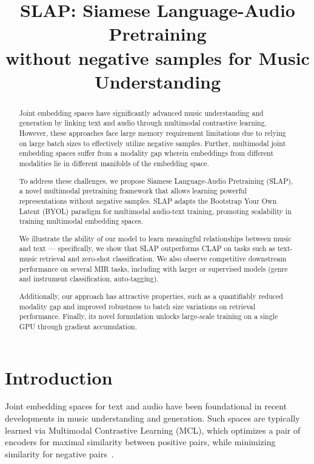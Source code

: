 \documentclass{article}
\title{SLAP: Siamese Language-Audio Pretraining\\without negative samples for Music Understanding}
\begin{document}
%
\maketitle

\begin{abstract}


Joint embedding spaces have significantly advanced music understanding and generation by linking text and audio through multimodal contrastive learning.
However, these approaches face large memory requirement limitations due to relying on large batch sizes to effectively utilize negative samples. Further, multimodal joint embedding spaces suffer from a modality gap wherein embeddings from different modalities lie in different manifolds of the embedding space.

To address these challenges, we propose Siamese Language-Audio Pretraining (SLAP), a novel multimodal pretraining framework that allows learning powerful representations without negative samples. SLAP adapts the Bootstrap Your Own Latent (BYOL) paradigm for multimodal audio-text training, promoting scalability in training multimodal embedding spaces.

We illustrate the ability of our model to learn meaningful relationships between music and text --- specifically, we show that SLAP outperforms CLAP on tasks such as text-music retrieval and zero-shot classification. We also observe competitive downstream performance on several MIR tasks, including with larger or supervised models (genre and instrument classification, auto-tagging).

Additionally, our approach has attractive properties, such as a quantifiably reduced modality gap and improved robustness to batch size variations on retrieval performance.
Finally, its novel formulation unlocks large-scale training on a single GPU through gradient accumulation. 

\end{abstract}


\section{Introduction}


Joint embedding spaces for text and audio have been foundational in recent developments in music understanding and generation.
Such spaces are typically learned via Multimodal Contrastive Learning (MCL), which optimizes
a pair of encoders for maximal similarity between positive pairs, while minimizing similarity for negative pairs~\cite{clip,elizalde2023clap}.
\end{document}
